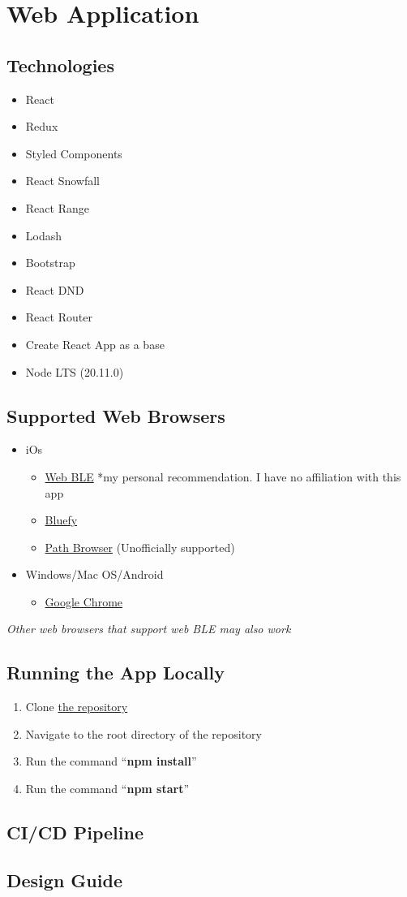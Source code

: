 \chapter{Web Application}
\section{Technologies}
\begin{itemize}
    \item React
    \item Redux
    \item Styled Components
    \item React Snowfall
    \item React Range
    \item Lodash
    \item Bootstrap
    \item React DND
    \item React Router
    \item Create React App as a base
    \item Node LTS (20.11.0)
\end{itemize}
\section{Supported Web Browsers}
\begin{itemize}
    \item iOs
        \begin{itemize}
            \item \href{https://apps.apple.com/us/app/webble/id1193531073}{Web BLE} *my personal recommendation. I have no affiliation with this app 
            \item \href{https://apps.apple.com/us/app/bluefy-web-ble-browser/id1492822055}{Bluefy}
            \item \href{https://apps.apple.com/us/app/path-browser/id1519521388}{Path Browser} (Unofficially supported)
        \end{itemize} 
    \item Windows/Mac OS/Android
        \begin{itemize}
            \item \href{https://www.google.com/chrome/Chrome}{Google Chrome}
        \end{itemize} 
\end{itemize}
\textit{Other web browsers that support web BLE may also work}
\section{Running the App Locally}
\begin{enumerate}
    \item Clone \href{https://github.com/ImACoderImACoderImACoder/onyx}{the repository}
    \item Navigate to the root directory of the repository
    \item Run the command ``\textbf{npm install}''
    \item Run the command ``\textbf{npm start}''
\end{enumerate}
\section{CI/CD Pipeline}
\section{Design Guide}